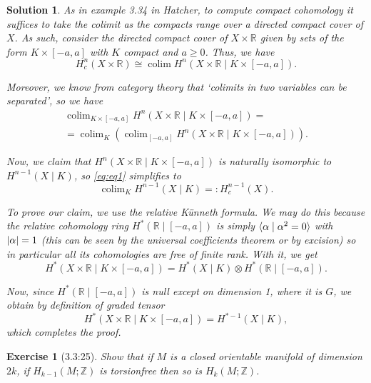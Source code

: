\documentclass{article}
\theoremstyle{plain}
\newtheorem*{ex}{Exercise}
\theoremstyle{nonumberplain}
\newtheorem{sol}{Solution}
\newcommand{\R}{\mathbb{R}}
\newcommand{\Z}{\mathbb{Z}}
\DeclareMathOperator*{\colim}{colim}
\DeclarePairedDelimiter{\abs}{\lvert}{\rvert}
\DeclarePairedDelimiter{\braket}{\langle}{\rangle}
\begin{document}
\begin{sol}
As in example 3.34 in Hatcher, to compute compact cohomology it suffices to take the colimit as the compacts range over a directed compact cover of $X$. As such, consider the directed compact cover of $X \times \R$ given by sets of the form $K \times [-a,a]$ with $K$ compact and $a \geq 0$. Thus, we have
\begin{equation}
H^n_c(X \times \R) \cong \colim H^n(X \times \R \mid K \times [-a,a]).
\end{equation}

Moreover, we know from category theory that `colimits in two variables can be separated', so we have
\begin{multline}\label{eq:eq1}
\colim_{K \times [-a,a]} H^n(X \times \R \mid K \times [-a,a]) = \\
= \colim_K \left( \colim_{[-a,a]} H^n(X \times \R \mid K \times [-a,a]) \right).
\end{multline}

Now, we claim that $H^n(X \times \R \mid K \times [-a,a])$ is naturally isomorphic to $H^{n-1}(X \mid K)$, so \eqref{eq:eq1} simplifies to
\begin{equation}
\colim_K H^{n-1}(X \mid K) =: H^{n-1}_c(X).
\end{equation}

To prove our claim, we use the relative Künneth formula. We may do this because the relative cohomology ring $H^*(\R \mid [-a,a])$ is simply $\braket{\alpha \mid \alpha^2 = 0}$ with $\abs{\alpha} = 1$ (this can be seen by the universal coefficients theorem or by excision) so in particular all its cohomologies are free of finite rank.  With it, we get
\begin{equation}
H^*(X \times \R \mid K \times [-a,a]) = H^*(X \mid K) \otimes H^*(\R \mid [-a,a]).
\end{equation}

Now, since $H^*(\R \mid [-a,a])$ is null except on dimension 1, where it is $G$, we obtain by definition of graded tensor
\begin{equation}
H^*(X \times \R \mid K \times [-a,a]) = H^{*-1}(X \mid K),
\end{equation}
which completes the proof.
\end{sol}

\begin{ex}[3.3:25]
Show that if $M$ is a closed orientable manifold of dimension $2k$, if $H_{k-1}(M;\Z)$ is torsionfree then so is $H_k(M;\Z)$.
\end{ex}
\end{document}
